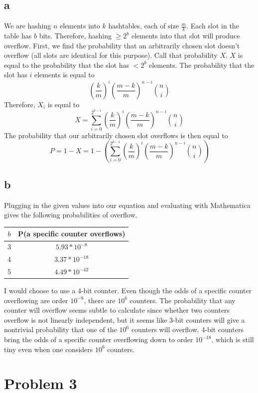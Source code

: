 \documentclass{article}
\begin{document}
\subsection*{a}
We are hashing $n$ elements into $k$ hashtables, each of size $\frac{m}{k}$. Each slot in the table has $b$ bits. Therefore, hashing $\geq 2^b$ elements into that slot will produce overflow.  First, we find the probability that an arbitrarily chosen slot doesn't overflow (all slots are identical for this purpose). Call that probability $X$. $X$ is equal to the probability that the slot has $< 2^b$ elements. The probability that the slot has $i$ elements is equal to 
$$(\frac{k}{m})^i (\frac{m-k}{m})^{n-i} {n \choose i}$$
Therefore, $X_i$ is equal to 
$$X = \sum\limits_{i=0}^{2^{b-1}} (\frac{k}{m})^i (\frac{m-k}{m})^{n-i} {n \choose i}$$
The probability that our arbitrarily chosen slot overflows is then equal to 
$$P = 1-X = 1-(\sum\limits_{i=0}^{2^{b-1}} (\frac{k}{m})^i (\frac{m-k}{m})^{n-i} {n \choose i})$$
\subsection*{b}
Plugging in the given values into our equation and evaluating with Mathematica gives the following probabilities of overflow.
\begin{center}
\begin{tabular}{ | c | c | }
\hline
$b$ & P(a specific counter overflows) \\
\hline\hline
3 & $5.93 * 10^{-8}$ \\
\hline
4 & $3.37 * 10^{-18}$\\
\hline
5 & $4.49 * 10^{-42}$\\
\hline
\end{tabular}
\end{center}
I would choose to use a 4-bit counter. Even though the odds of a specific counter overflowing are order $10^{-8}$, there are $10^6$ counters. The probability that any counter will overflow seems subtle to calculate since whether two counters overflow is not linearly independent, but it seems like 3-bit counters will give a nontrivial probability that one of the $10^6$ counters will overflow. 4-bit counters bring the odds of a specific counter overflowing down to order $10^{-18}$, which is still tiny even when one considers $10^6$ counters. 

\section*{Problem 3}
\end{document}
